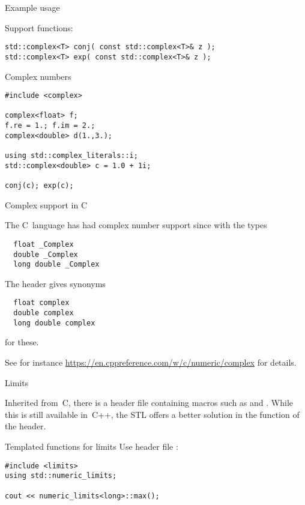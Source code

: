 \begin{block}{Example usage}
  \label{sl:complexvec}
\end{block}

Support functions:
\begin{lstlisting}
std::complex<T> conj( const std::complex<T>& z );
std::complex<T> exp( const std::complex<T>& z );
\end{lstlisting}

\begin{slide}{Complex numbers}
  \label{sl-complex}
\begin{lstlisting}
#include <complex>

complex<float> f;
f.re = 1.; f.im = 2.;
complex<double> d(1.,3.);

using std::complex_literals::i;
std::complex<double> c = 1.0 + 1i;

conj(c); exp(c);
\end{lstlisting}
\end{slide}


 {Complex support in C}

The C~language has had complex number support
since  with the types
\begin{lstlisting}
  float _Complex
  double _Complex
  long double _Complex
\end{lstlisting}
The header 
gives synonyms
\begin{lstlisting}
  float complex
  double complex
  long double complex
\end{lstlisting}
for these.

See for instance \url{https://en.cppreference.com/w/c/numeric/complex}
for details.

 {Limits}
\label{sec:limits}

Inherited from~C, 
there is a header file  containing
macros such as  and .
While this is still available in~C++,
the \ac{STL} offers a better solution in the
 function
of the  header.

\begin{block}{Templated functions for limits}
  \label{sl:stl-limits}
  Use header file :
\begin{lstlisting}
#include <limits>
using std::numeric_limits;

cout << numeric_limits<long>::max();
\end{lstlisting}
\end{block}

